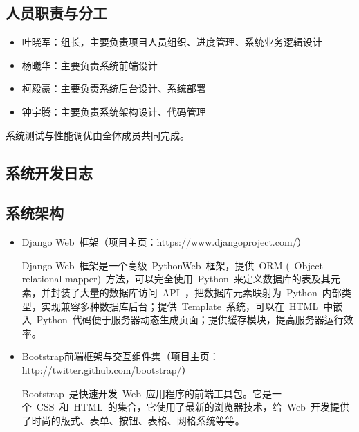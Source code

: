 \appendix
\begin{center}
  \section{人员职责与分工}
\end{center}

\begin{itemize}
  \item 叶晓军：组长，主要负责项目人员组织、进度管理、系统业务逻辑设计
  \item 杨曦华：主要负责系统前端设计
  \item 柯毅豪：主要负责系统后台设计、系统部署
  \item 钟宇腾：主要负责系统架构设计、代码管理
\end{itemize}
系统测试与性能调优由全体成员共同完成。

\newpage

\begin{center}
  \section{系统开发日志}
\end{center}
\subsection{系统架构}
\begin{itemize}
  \item Django Web~框架（项目主页：https://www.djangoproject.com/）
  
  \CJKindent Django Web~框架是一个高级~Python\footnotemark[1] Web~框架，提供~ORM (~Object-relational mapper)~方法，可以完全使用~Python~来定义数据库的表及其元素，并封装了大量的数据库访问~API~，把数据库元素映射为~Python~内部类型，实现兼容多种数据库后台；提供~Template~系统，可以在~HTML~中嵌入~Python~代码便于服务器动态生成页面；提供缓存模块，提高服务器运行效率。
  
  \item Bootstrap前端框架与交互组件集（项目主页：http://twitter.github.com/bootstrap/）
  
  \CJKindent Bootstrap~是快速开发~Web~应用程序的前端工具包。它是一个~CSS~和~HTML~的集合，它使用了最新的浏览器技术，给~Web~开发提供了时尚的版式、表单、按钮、表格、网格系统等等。
\end{itemize}



